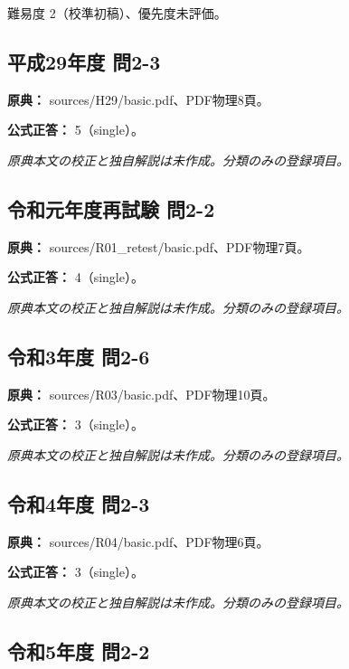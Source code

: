 \par 難易度 2（校準初稿）、優先度未評価。

\subsection{平成29年度 問2-3}
\label{q:h29-reg-basic-2-3}

\noindent\textbf{原典：} sources/H29/basic.pdf、PDF物理8頁。

\textbf{公式正答：} 5（single）。

\par\textit{原典本文の校正と独自解説は未作成。分類のみの登録項目。}

\subsection{令和元年度再試験 問2-2}
\label{q:r01-ret-basic-2-2}

\noindent\textbf{原典：} sources/R01\_retest/basic.pdf、PDF物理7頁。

\textbf{公式正答：} 4（single）。

\par\textit{原典本文の校正と独自解説は未作成。分類のみの登録項目。}

\subsection{令和3年度 問2-6}
\label{q:r03-reg-basic-2-6}

\noindent\textbf{原典：} sources/R03/basic.pdf、PDF物理10頁。

\textbf{公式正答：} 3（single）。

\par\textit{原典本文の校正と独自解説は未作成。分類のみの登録項目。}

\subsection{令和4年度 問2-3}
\label{q:r04-reg-basic-2-3}

\noindent\textbf{原典：} sources/R04/basic.pdf、PDF物理6頁。

\textbf{公式正答：} 3（single）。

\par\textit{原典本文の校正と独自解説は未作成。分類のみの登録項目。}

\subsection{令和5年度 問2-2}
\label{q:r05-reg-basic-2-2}

